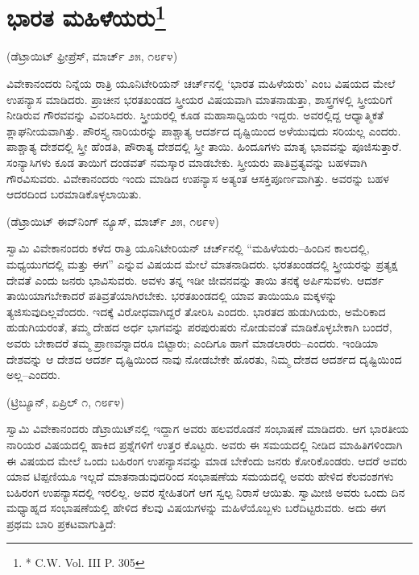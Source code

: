 \delimiter


\section[ಭಾರತ ಮಹಿಳೆಯರು]{ಭಾರತ ಮಹಿಳೆಯರು\protect\footnote{* C.W. Vol. III P. 305}}

\begin{center}
(ಡೆಟ್ರಾಯಿಟ್​ ಫ್ರೀಪ್ರೆಸ್​, ಮಾರ್ಚ್​ ೨೫, ೧೮೯೪)
\end{center}

ವಿವೇಕಾನಂದರು ನಿನ್ನೆಯ ರಾತ್ರಿ ಯೂನಿಟೇರಿಯನ್​ ಚರ್ಚ್​ನಲ್ಲಿ ‘ಭಾರತ ಮಹಿಳೆಯರು’ ಎಂಬ ವಿಷಯದ ಮೇಲೆ ಉಪನ್ಯಾಸ ಮಾಡಿದರು. ಪ್ರಾಚೀನ ಭರತಖಂಡದ ಸ್ತ್ರೀಯರ ವಿಷಯವಾಗಿ ಮಾತನಾಡುತ್ತಾ, ಶಾಸ್ತ್ರಗಳಲ್ಲಿ ಸ್ತ್ರೀಯರಿಗೆ ನೀಡಿರುವ ಗೌರವವನ್ನು ವಿವರಿಸಿದರು. ಸ್ತ್ರೀಯರಲ್ಲಿ ಕೂಡ ಮಹಾಸಾಧ್ವಿಯರು ಇದ್ದರು. ಅವರಲ್ಲಿದ್ದ ಆಧ್ಯಾತ್ಮಿಕತೆ ಶ್ಲಾಘನೀಯವಾಗಿತ್ತು. ಪೌರಸ್ತ್ಯ ನಾರಿಯರನ್ನು ಪಾಶ್ಚಾತ್ಯ ಆದರ್ಶದ ದೃಷ್ಟಿಯಿಂದ ಅಳೆಯುವುದು ಸರಿಯಲ್ಲ ಎಂದರು. ಪಾಶ್ಚಾತ್ಯ ದೇಶದಲ್ಲಿ ಸ್ತ್ರೀ ಹೆಂಡತಿ, ಪೌರಾತ್ಯ ದೇಶದಲ್ಲಿ ಸ್ತ್ರೀ ತಾಯಿ. ಹಿಂದೂಗಳು ಮಾತೃ ಭಾವವನ್ನು ಪೂಜಿಸುತ್ತಾರೆ. ಸಂನ್ಯಾಸಿಗಳು ಕೂಡ ತಾಯಿಗೆ ದಂಡವತ್​ ನಮಸ್ಕಾರ ಮಾಡಬೇಕು. ಸ್ತ್ರೀಯರು ಪಾತಿವ್ರತ್ಯವನ್ನು ಬಹಳವಾಗಿ ಗೌರವಿಸುವರು. ವಿವೇಕಾನಂದರು ಇಂದು ಮಾಡಿದ ಉಪನ್ಯಾಸ ಅತ್ಯಂತ ಆಸಕ್ತಿಪೂರ್ಣವಾಗಿತ್ತು. ಅವರನ್ನು ಬಹಳ ಆದರದಿಂದ ಬರಮಾಡಿಕೊಳ್ಳಲಾಯಿತು.

\delimiter

\begin{center}
(ಡೆಟ್ರಾಯಿಟ್​ ಈವ್​ನಿಂಗ್​ ನ್ಯೂಸ್​, ಮಾರ್ಚ್​ ೨೫, ೧೮೯೪)
\end{center}

ಸ್ವಾಮಿ ವಿವೇಕಾನಂದರು ಕಳೆದ ರಾತ್ರಿ ಯೂನಿಟೇರಿಯನ್​ ಚರ್ಚ್​ನಲ್ಲಿ “ಮಹಿಳೆಯರು–ಹಿಂದಿನ ಕಾಲದಲ್ಲಿ, ಮಧ್ಯಯುಗದಲ್ಲಿ ಮತ್ತು ಈಗ” ಎನ್ನುವ ವಿಷಯದ ಮೇಲೆ ಮಾತನಾಡಿದರು. ಭರತಖಂಡದಲ್ಲಿ ಸ್ತ್ರೀಯರನ್ನು ಪ್ರತ್ಯಕ್ಷ ದೇವತೆ ಎಂದು ಜನರು ಭಾವಿಸುವರು. ಅವಳು ತನ್ನ ಇಡೀ ಜೀವನವನ್ನು ತಾಯಿ ತನಕ್ಕೆ ಅರ್ಪಿಸುವಳು. ಆದರ್ಶ ತಾಯಿಯಾಗಬೇಕಾದರೆ ಪತಿವ್ರತೆಯಾಗಿರಬೇಕು. ಭರತಖಂಡದಲ್ಲಿ ಯಾವ ತಾಯಿಯೂ ಮಕ್ಕಳನ್ನು ತ್ಯಜಿಸುವುದಿಲ್ಲವೆಂದರು. ಇದಕ್ಕೆ ವಿರೋಧವಾಗಿದ್ದರೆ ತೋರಿಸಿ ಎಂದರು. ಭಾರತದ ಹುಡುಗಿಯರು, ಅಮೆರಿಕಾದ ಹುಡುಗಿಯರಂತೆ, ತಮ್ಮ ದೇಹದ ಅರ್ಧ ಭಾಗವನ್ನು ಪರಪುರುಷರು ನೋಡುವಂತೆ ಮಾಡಿಕೊಳ್ಳಬೇಕಾಗಿ ಬಂದರೆ, ಅವರು ಬೇಕಾದರೆ ತಮ್ಮ ಪ್ರಾಣವನ್ನಾದರೂ ಬಿಟ್ಟಾರು; ಎಂದಿಗೂ ಹಾಗೆ ಮಾಡಲಾರರು–ಎಂದರು. ಇಂಡಿಯಾ ದೇಶವನ್ನು ಆ ದೇಶದ ಆದರ್ಶ ದೃಷ್ಟಿಯಿಂದ ನಾವು ನೋಡಬೇಕೇ ಹೊರತು, ನಿಮ್ಮ ದೇಶದ ಆದರ್ಶದ ದೃಷ್ಟಿಯಿಂದ ಅಲ್ಲ–ಎಂದರು.

\delimiter

\begin{center}
(ಟ್ರಿಬ್ಯೂನ್​, ಏಪ್ರಿಲ್​ ೧, ೧೮೯೪)
\end{center}

ಸ್ವಾಮಿ ವಿವೇಕಾನಂದರು ಡೆಟ್ರಾಯಿಟ್​ನಲ್ಲಿ ಇದ್ದಾಗ ಅವರು ಹಲವರೊಡನೆ ಸಂಭಾಷಣೆ ಮಾಡಿದರು. ಆಗ ಭಾರತೀಯ ನಾರಿಯರ ವಿಷಯದಲ್ಲಿ ಹಾಕಿದ ಪ್ರಶ್ನೆಗಳಿಗೆ ಉತ್ತರ ಕೊಟ್ಟರು. ಅವರು ಈ ಸಮಯದಲ್ಲಿ ನೀಡಿದ ಮಾಹಿತಿಗಳಿಂದಾಗಿ ಈ ವಿಷಯದ ಮೇಲೆ ಒಂದು ಬಹಿರಂಗ ಉಪನ್ಯಾಸವನ್ನು ಮಾಡ ಬೇಕೆಂದು ಜನರು ಕೋರಿಕೊಂಡರು. ಆದರೆ ಅವರು ಯಾವ ಟಿಪ್ಪಣಿಯೂ ಇಲ್ಲದೆ ಮಾತನಾಡುವುದರಿಂದ ಸಂಭಾಷಣೆಯ ಸಮಯದಲ್ಲಿ ಅವರು ಹೇಳಿದ ಕೆಲವಂಶಗಳು ಬಹಿರಂಗ ಉಪನ್ಯಾಸದಲ್ಲಿ ಇರಲಿಲ್ಲ. ಅವರ ಸ್ನೇಹಿತರಿಗೆ ಆಗ ಸ್ವಲ್ಪ ನಿರಾಸೆ ಆಯಿತು. ಸ್ವಾಮೀಜಿ ಅವರು ಒಂದು ದಿನ ಮಧ್ಯಾಹ್ನದ ಸಂಭಾಷಣೆಯಲ್ಲಿ ಹೇಳಿದ ಕೆಲವು ವಿಷಯಗಳನ್ನು ಮಹಿಳೆಯೊಬ್ಬಳು ಬರೆದಿಟ್ಟರುವರು. ಅದು ಈಗ ಪ್ರಥಮ ಬಾರಿ ಪ್ರಕಟವಾಗುತ್ತಿದೆ:

